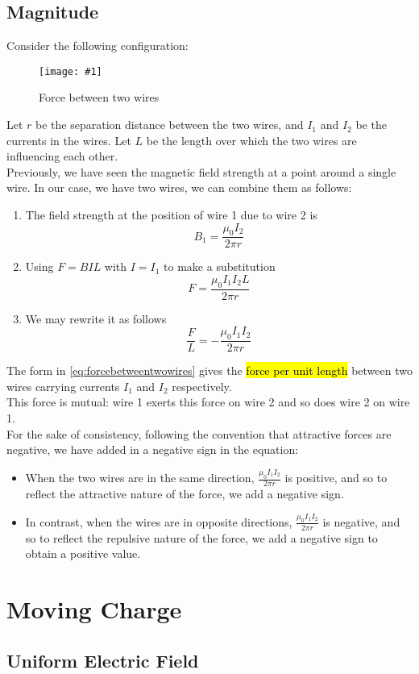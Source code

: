 \documentclass[a4paper,12pt]{article}
\let\oldsection\section
\renewcommand\section{\clearpage\oldsection}
\newcommand{\lb}{\\[8pt]}
\newcommand{\img}[4]{\begin{center}
  \begin{figure}[H]
    \centering
    \texttt{[image: \#1]}
    \caption{#3}
    \label{fig:#4}
  \end{figure}
\end{center}}
\begin{document}
\subsection{Magnitude}
Consider the following configuration:
\img{twowireforce.png}{0.45}{Force between two wires}{twowireforce}
Let $r$ be the separation distance between the two wires, and $I_1$ and $I_2$ be the currents in the wires. Let $L$ be the length over which the two wires are influencing each other.\lb
Previously, we have seen the magnetic field strength at a point around a single wire. In our case, we have two wires, we can combine them as follows:
\begin{enumerate}
  \item The field strength at the position of wire 1 due to wire 2 is $$B_1 = \frac{\mu_0I_2}{2\pi r}$$
  \item Using $F = BIL$ with $I = I_1$ to make a substitution
        $$F = \frac{\mu_0I_1I_2L}{2\pi r}$$
  \item We may rewrite it as follows
        \begin{equation}\label{eq:forcebetweentwowires}
          \frac{F}{L} = -\frac{\mu_0I_1I_2}{2\pi r}
        \end{equation}
\end{enumerate}
The form in \cref{eq:forcebetweentwowires} gives the \hl{force per unit length} between two wires carrying currents $I_1$ and $I_2$ respectively.\lb
This force is mutual: wire 1 exerts this force on wire 2 and so does wire 2 on wire 1.\lb
For the sake of consistency, following the convention that attractive forces are negative, we have added in a negative sign in the equation:
\begin{itemize}
  \item When the two wires are in the same direction, $\frac{\mu_0I_1I_2}{2\pi r}$ is positive, and so to reflect the attractive nature of the force, we add a negative sign.
  \item In contrast, when the wires are in opposite directions, $\frac{\mu_0I_1I_2}{2\pi r}$ is negative, and so to reflect the repulsive nature of the force, we add a negative sign to obtain a positive value.
\end{itemize}

\section{Moving Charge}

\subsection{Uniform Electric Field}
\end{document}
